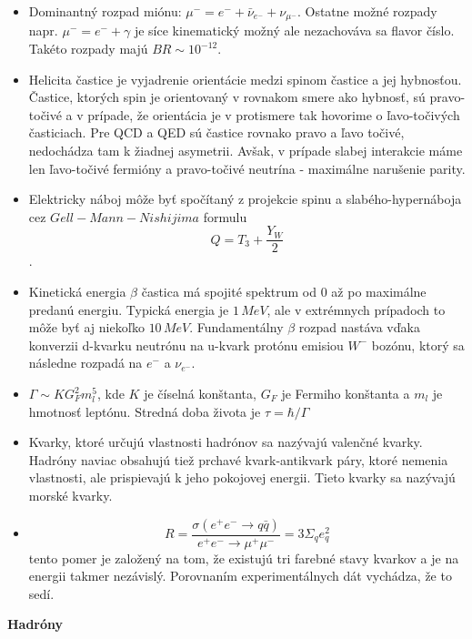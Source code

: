 \documentclass[../../main.tex]{subfiles}
\begin{document}
\begin{itemize}
\item Dominantný rozpad miónu: $\mu^-=e^-+\bar{\nu}_{e^-}+\nu_{{\mu}^-}$. Ostatne možné rozpady napr. $\mu^-=e^-+\gamma$ je síce kinematický možný ale nezachováva sa flavor číslo. Takéto rozpady majú $BR\sim10^{-12}$.
\item Helicita častice je vyjadrenie orientácie medzi spinom častice a jej hybnosťou. Častice, ktorých spin je orientovaný v rovnakom smere ako hybnosť, sú pravo-točivé a v prípade, že orientácia je v protismere tak hovorime o ľavo-točivých časticiach. Pre QCD a QED sú častice rovnako pravo a ľavo točivé, nedochádza tam k žiadnej asymetrii. Avšak, v prípade slabej interakcie máme len ľavo-točivé fermióny a pravo-točivé neutrína - maximálne narušenie parity.
\item Elektricky náboj môže byť spočítaný z projekcie spinu a slabého-hypernáboja cez $Gell-Mann-Nishijima$ formulu $$Q=T_3+\frac{Y_W}{2}$$.
\item Kinetická energia $\beta$ častica má spojité spektrum od 0 až po maximálne predanú energiu. Typická energia je $1\,MeV$, ale v extrémnych prípadoch to môže byť aj niekoľko $10\,MeV$. Fundamentálny $\beta$ rozpad nastáva vďaka konverzii d-kvarku neutrónu na u-kvark protónu emisiou $W^-$ bozónu, ktorý sa následne rozpadá na $e^-$ a $\nu_{e^-}$.
\item $\Gamma\sim KG_F^2m_l^5$, kde $K$ je číselná konštanta, $G_F$ je Fermiho konštanta a $m_l$ je hmotnosť leptónu. Stredná doba života je $\tau=\hbar/\Gamma$
\item Kvarky, ktoré určujú vlastnosti hadrónov sa nazývajú valenčné kvarky. Hadróny naviac obsahujú tiež prchavé kvark-antikvark páry, ktoré nemenia vlastnosti, ale prispievajú k jeho pokojovej energii. Tieto kvarky sa nazývajú morské kvarky.
\item $$ R=\frac{\sigma(e^+e^-\rightarrow q\bar{q})}{e^+e^-\rightarrow \mu^+ \mu^-}=3\Sigma_{q}e^2_q$$ tento pomer je založený na tom, že existujú tri farebné stavy kvarkov a je na energii takmer nezávislý. Porovnaním experimentálnych dát vychádza, že to sedí.\newline
\end{itemize}
\textbf{Hadróny}
\end{document}
